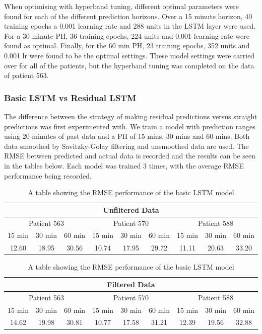       When optimising with hyperband tuning, different optimal parameters were found for each of the different prediction horizons. Over a 15 minute horizon, 40 training epochs a 0.001 learning rate and 288 units in the LSTM layer were used. For a 30 minute PH, 36 training epochs, 224 units and 0.001 learning rate were found as optimal. Finally, for the 60 min PH, 23 training epochs, 352 units and 0.001 lr were found to be the optimal settings. These model settings were carried over for all of the patients, but the hyperband tuning was completed on the data of patient 563.

    \subsubsection{Basic LSTM vs Residual LSTM}
      
      The difference between the strategy of making residual predictions versus straight predictions was first experimented with. We train a model with prediction ranges using 20 minutes of past data and a PH of 15 mins, 30 mins and 60 mins. Both data smoothed by Savitzky-Golay filtering and unsmoothed data are used. The RMSE between predicted and actual data is recorded and the results can be seen in the tables below. Each model was trained 3 times, with the average RMSE performance being recorded.

      \begin{table}[H]
        \centering
        \caption{A table showing the RMSE performance of the basic LSTM model}
        \begin{tabular}{|*{9}{c|}} 
          \hline
          \multicolumn{9}{|c|}{Unfiltered Data} \\ \hline
          \multicolumn{3}{|c}{Patient 563} & \multicolumn{3}{|c}{Patient 570} & \multicolumn{3}{|c|}{Patient 588} \\ \hline 
          15 min & 30 min & 60 min &15 min & 30 min & 60 min &15 min & 30 min & 60 min \\ \hline
          12.60&18.95 &30.56 &10.74 &17.95 &29.72 &11.11 &20.63 &33.20 \\ \hline
        \end{tabular}
        \begin{tabular}{|*{9}{c|}} 
          \hline
          \multicolumn{9}{|c|}{Filtered Data} \\ \hline
          \multicolumn{3}{|c}{Patient 563} & \multicolumn{3}{|c}{Patient 570} & \multicolumn{3}{|c|}{Patient 588} \\ \hline 
          15 min & 30 min & 60 min &15 min & 30 min & 60 min &15 min & 30 min & 60 min \\ \hline
          14.62 &19.98 &30.81 &10.77 &17.58 &31.21 &12.39 &19.56 &32.88 \\ \hline
        \end{tabular}
      \end{table}

